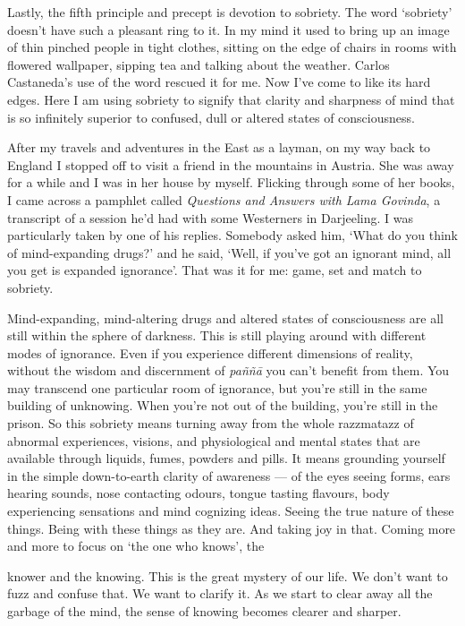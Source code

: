 Lastly, the fifth principle and precept is devotion to sobriety. The
word `sobriety' doesn't have such a pleasant ring to it. In my mind it
used to bring up an image of thin pinched people in tight clothes,
sitting on the edge of chairs in rooms with flowered wallpaper, sipping
tea and talking about the weather. Carlos Castaneda's use of the word
rescued it for me. Now I've come to like its hard edges. Here I am using
sobriety to signify that clarity and sharpness of mind that is so
infinitely superior to confused, dull or altered states of
consciousness.

After my travels and adventures in the East as a layman, on my way back
to England I stopped off to visit a friend in the mountains in Austria.
She was away for a while and I was in her house by myself. Flicking
through some of her books, I came across a pamphlet called
\emph{Questions and Answers with Lama Govinda}, a transcript of a
session he'd had with some Westerners in Darjeeling. I was particularly
taken by one of his replies. Somebody asked him, `What do you think of
mind-expanding drugs?' and he said, `Well, if you've got an ignorant
mind, all you get is expanded ignorance'. That was it for me: game, set
and match to sobriety.

Mind-expanding, mind-altering drugs and altered states of consciousness
are all still within the sphere of darkness. This is still playing
around with different modes of ignorance. Even if you experience
different dimensions of reality, without the wisdom and discernment of
\emph{paññā} you can't benefit from them. You may transcend one
particular room of ignorance, but you're still in the same building of
unknowing. When you're not out of the building, you're still in the
prison. So this sobriety means turning away from the whole razzmatazz of
abnormal experiences, visions, and physiological and mental states that
are available through liquids, fumes, powders and pills. It means
grounding yourself in the simple down-to-earth clarity of awareness ---
of the eyes seeing forms, ears hearing sounds, nose contacting odours,
tongue tasting flavours, body experiencing sensations and mind cognizing
ideas. Seeing the true nature of these things. Being with these things
as they are. And taking joy in that. Coming more and more to focus on
`the one who knows', the

knower and the knowing. This is the great mystery of our life. We don't
want to fuzz and confuse that. We want to clarify it. As we start to
clear away all the garbage of the mind, the sense of knowing becomes
clearer and sharper.

